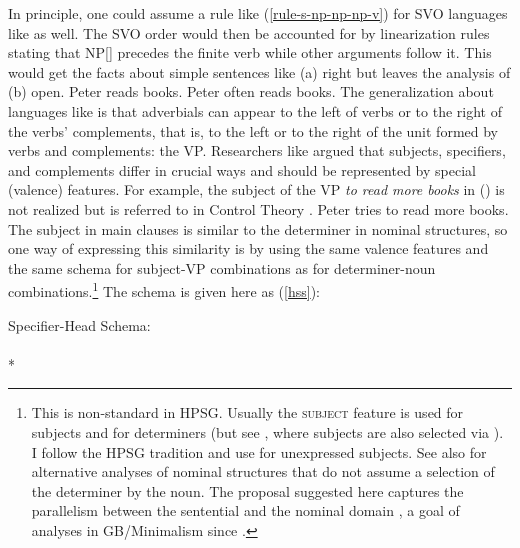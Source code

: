 \documentclass[output=paper,biblatex,babelshorthands,newtxmath,draftmode,colorlinks,citecolor=brown]{langscibook}
\begin{document}
In principle, one could assume a rule like (\ref{rule-s-np-np-np-v}) for SVO languages like 
as well. The SVO order would then be accounted for by linearization rules stating that
NP[] precedes the finite verb while other arguments follow it. This would get the facts
about simple sentences like (a) right but leaves the analysis of (b) open.
\eal
\ex Peter reads books.
\ex Peter often reads books.
\zl
The generalization about languages like  is that adverbials can appear to the left of
verbs or to the right of the verbs' complements, that is, to the left or to the right of the unit
formed by verbs and complements: the VP. Researchers like \citet{Borsley87a} argued that subjects,
specifiers, and complements differ in crucial ways and should be represented by special (valence)
features. For example, the subject of the VP \emph{to read  more books} in () is not realized but is
referred to in Control Theory . 
\ea
Peter tries to read more books.
\z 
The subject in  main clauses is similar to the determiner in nominal structures, so one
way of expressing this similarity is by using the same valence features and the same schema for
subject-VP combinations as for determiner-noun combinations.\footnote{
  This is non-standard in HPSG. Usually the \textsc{subject} feature is used for subjects and \spr
  for determiners (but see , where subjects are also selected via
  \spr). I follow the  HPSG tradition and use \subj for unexpressed subjects. See 
  also  for alternative analyses of nominal structures that do not assume a
  selection of the determiner by the noun. The proposal suggested here captures the parallelism
  between the sentential and the nominal domain \citep{MyPM2021a}, a goal of analyses in
    GB/Minimalism since .%
}
The schema is given here as (\ref{hss}):

\ea
\label{hss}
Specifier-Head Schema:\\
 \impl\\*
\z
\end{document}
